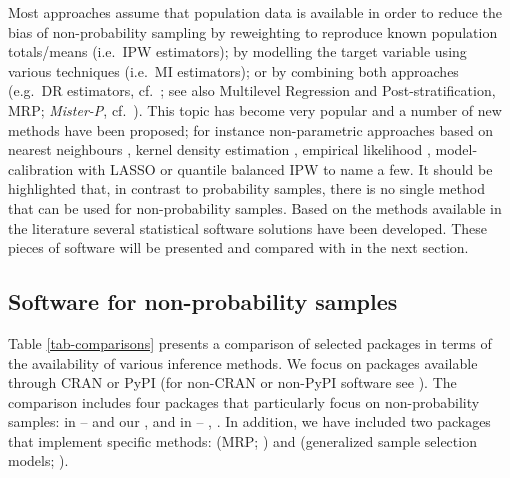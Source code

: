 \documentclass[
]{jss}
\begin{document}
Most approaches assume that population data is available in order to
reduce the bias of non-probability sampling by reweighting to reproduce
known population totals/means (i.e.~IPW estimators); by modelling the
target variable using various techniques (i.e.~MI estimators); or by
combining both approaches (e.g.~DR estimators,
cf.~\citet{chen2020doubly}; see also Multilevel Regression and
Post-stratification, MRP; \textit{Mister-P},
cf.~\citet{gelman1997poststratification}). This topic has become very
popular and a number of new methods have been proposed; for instance
non-parametric approaches based on nearest neighbours
\citep{yang2021integration}, kernel density estimation
\citep{chen_nonparametric_2022}, empirical likelihood
\citep{kim2023empirical}, model-calibration with LASSO \citep{chen2018}
or quantile balanced IPW \citep{beresewicz2025} to name a few. It should
be highlighted that, in contrast to probability samples, there is no
single method that can be used for non-probability samples. Based on the
methods available in the literature several statistical software
solutions have been developed. These pieces of software will be
presented and compared with  in the next section.

\subsection{Software for non-probability samples}\label{sec-software}

Table \ref{tab-comparisons} presents a comparison of selected packages
in terms of the availability of various inference methods. We focus on
packages available through CRAN or PyPI (for non-CRAN or non-PyPI
software see \citet{cobo2024software}). The comparison includes four
packages that particularly focus on non-probability samples: in
 --  \citep{NonProbEst} and our
, and in  -- 
\citep{sarig2023balancepythonpackage}, 
\citep{castro2024inps}. In addition, we have included two 
packages that implement specific methods:  (MRP;
\citet{rstanarm}) and  (generalized sample selection models;
\citet{GJRM}).
\end{document}
